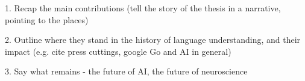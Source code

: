 
1. Recap the main contributions (tell the story of the thesis in a narrative, pointing to the places)

2. Outline where they stand in the history of language understanding, and their impact (e.g. cite press cuttings, google Go and AI in general)

3. Say what remains - the future of AI, the future of neuroscience